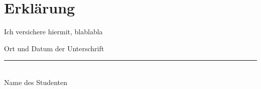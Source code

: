 
\thispagestyle{empty}

\section*{Erklärung}
\vspace*{2em}

Ich versichere hiermit, blablabla

\vspace{3em}

{\color{red}Ort und Datum der Unterschrift}
\vspace{4em}

\rule{7cm}{0.4pt}\\
Name des Studenten
